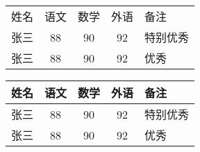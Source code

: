 \documentclass{ctexart}
\begin{document}
	\begin{tabular}{lcccp{1.2cm}} 
		姓名 & 语文 & 数学 & 外语 & 备注 \\ 
		张三 & 88 & 90 & 92 & 特别优秀 \\
		张三 & 88 & 90 & 92 & 优秀 \\
	\end{tabular}

	\begin{tabular}{|l||c|c|c|p{1.2cm}|} %
		\hline %
		姓名 & 语文 & 数学 & 外语 & 备注 \\ 
		\hline %
		张三 & 88 & 90 & 92 & 特别优秀 \\
		\hline \hline %
		张三 & 88 & 90 & 92 & 优秀 \\
		\hline

	\end{tabular}
\end{document}
